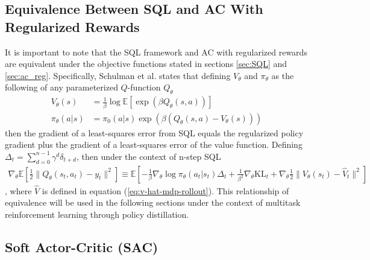 \documentclass[12pt]{report}
\begin{document}
\subsection{Equivalence Between SQL and AC With Regularized Rewards}

It is important to note that the SQL framework and AC with regularized rewards are equivalent under the objective functions stated in sections \ref{sec:SQL} and \ref{sec:ac_reg}. Specifically, Schulman et al. \cite{schulman2017equivalence} states that defining $V_\theta$ and $\pi_\theta$ as the following of any parameterized $Q$-function $Q_\theta$
\begin{align}
    V_\theta(s)&=\frac{1}{\beta}\log \mathbb{E}[\exp(\beta Q_\theta(s,a))]\\
    \pi_\theta(a|s)&=\pi_0(a|s)\exp(\beta(Q_\theta(s,a)-V_\theta(s)))
\end{align}
then the gradient of a least-squares error from SQL equals the regularized policy gradient plus the gradient of a least-squares error of the value function. Defining $\Delta_t = \sum_{d=0}^{n-1} \gamma^d \delta_{t+d}$, then under the context of n-step SQL
\begin{align}
    \nabla_\theta \mathbb{E}\left[\frac{1}{2}\|Q_\theta(s_t,a_t)-y_t\|^2\right] \equiv \mathbb{E}\left[-\frac{1}{\beta}\nabla_\theta \log \pi_\theta(a_t|s_t)\Delta_t + {\frac{1}{\beta^2}} \nabla_\theta \text{KL}_t + \nabla_\theta \frac{1}{2}\|V_\theta(s_t)-\hat{V}_t\|^2
    \right]
\end{align}
, where $\hat{V}$ is defined in equation (\ref{eq:v-hat-mdp-rollout}). This relationship of equivalence will be used in the following sections under the context of multitask reinforcement learning through policy distillation.

\subsection{Soft Actor-Critic (SAC)}
\end{document}

